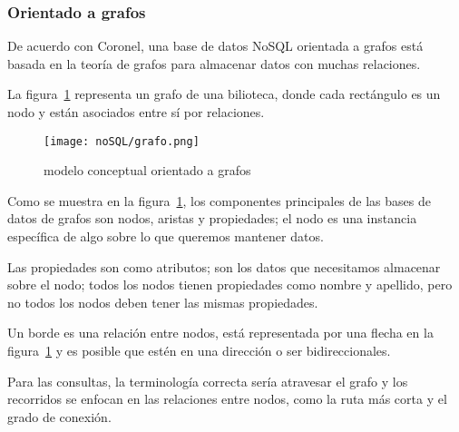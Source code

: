 \subsubsection{Orientado a grafos}
De acuerdo con Coronel\cite{coronel_database_nodate}, una base de datos NoSQL orientada a grafos está basada en la teoría de grafos para almacenar datos con muchas relaciones.



La figura~\ref{img:nosql-grafo} representa un grafo de una bilioteca, donde cada rectángulo es un nodo y están asociados entre sí por relaciones.
\begin{figure}[H] 
    \centering
    \texttt{[image: noSQL/grafo.png]}
    \caption{modelo conceptual orientado a grafos}
    \label{img:nosql-grafo}
\end{figure}


Como se muestra en la figura~\ref{img:nosql-grafo}, los componentes principales de las bases de datos de grafos son nodos, aristas y propiedades; el nodo es una instancia específica de algo sobre lo que queremos mantener datos.


Las propiedades son como atributos; son los datos que necesitamos almacenar sobre el nodo; todos los nodos tienen propiedades como nombre y apellido, pero no todos los nodos deben tener las mismas propiedades.


Un borde es una relación entre nodos, está representada por una flecha en la figura~\ref{img:nosql-grafo} y es posible que estén en una dirección o ser bidireccionales.


Para las consultas, la terminología correcta sería atravesar el grafo y los recorridos se enfocan en las relaciones entre nodos, como la ruta más corta y el grado de conexión.

